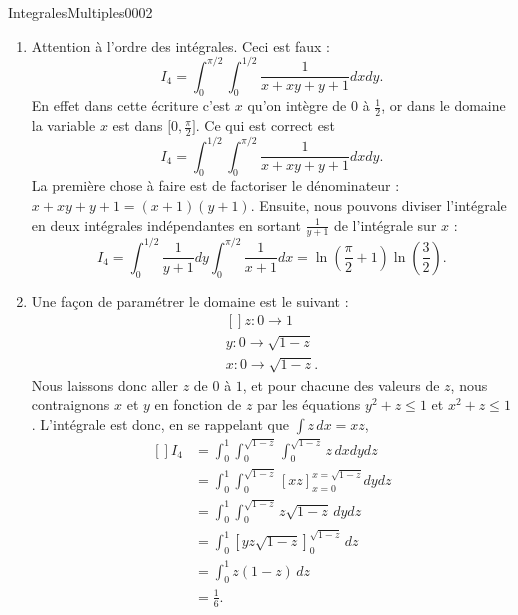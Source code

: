 \begin{corrige}{IntegralesMultiples0002}
\begin{enumerate}
		\item
			Attention à l'ordre des intégrales. Ceci est faux :
			\begin{equation}
				I_4=\int_0^{\pi/2}\int_0^{1/2}\frac{1}{ x+xy+y+1 }dxdy.
			\end{equation}
			En effet dans cette écriture c'est $x$ qu'on intègre de $0$ à $\frac{ 1 }{2}$, or dans le domaine la variable $x$ est dans $\mathopen[ 0 , \frac{ \pi }{ 2 } \mathclose]$. Ce qui est correct est
			\begin{equation}
				I_4=\int_0^{1/2}\int_0^{\pi/2}\frac{1}{ x+xy+y+1 }dxdy.
			\end{equation}
			La première chose à faire est de factoriser le dénominateur : $x+xy+y+1=(x+1)(y+1)$. Ensuite, nous pouvons diviser l'intégrale en deux intégrales indépendantes en sortant $\frac{1}{ y+1 }$ de l'intégrale sur $x$ :
			\begin{equation}
				I_4=\int_0^{1/2}\frac{1}{ y+1 }dy\int_0^{\pi/2}\frac{1}{ x+1 }dx=\ln\left( \frac{ \pi }{ 2 }+1 \right)\ln\left( \frac{ 3 }{ 2 } \right).
			\end{equation}
			
		\item
			Une façon de paramétrer le domaine est le suivant :
			\begin{equation}
				\begin{aligned}[]
					z\colon 0\to 1\\
					y\colon 0\to \sqrt{1-z}\\
					x\colon 0\to \sqrt{1-z}.
				\end{aligned}
			\end{equation}
			Nous laissons donc aller $z$ de $0$ à $1$, et pour chacune des valeurs de $z$, nous contraignons $x$ et $y$ en fonction de $z$ par les équations $y^2+z\leq 1$ et $x^2+z\leq 1$. L'intégrale est donc, en se rappelant que $\int z\,dx=xz$,
			\begin{equation}
				\begin{aligned}[]
					I_4&=\int_0^1\int_0^{\sqrt{1-z}}\int_{0}^{\sqrt{1-z}}z\,dxdydz\\
					&=\int_0^1\int_0^{\sqrt{1-z}}[xz]_{x=0}^{x=\sqrt{1-z}}dydz\\
					&=\int_0^1\int_0^{\sqrt{1-z}}z\sqrt{1-z}\,dydz\\
					&=\int_0^1[yz\sqrt{1-z}]_0^{\sqrt{1-z}}\,dz\\
					&=\int_0^1 z(1-z)\,dz\\
					&=\frac{1}{ 6 }.
				\end{aligned}
			\end{equation}
			

\end{enumerate}
\end{corrige}
